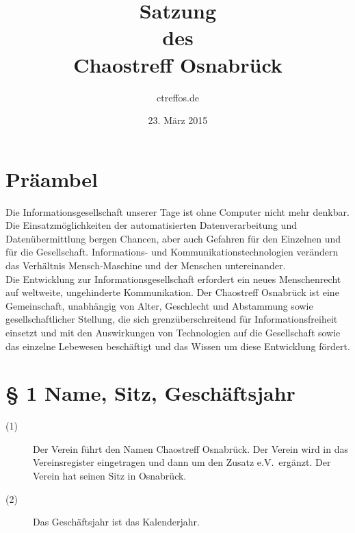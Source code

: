 \documentclass[12pt,paper=a4,ngerman]{scrreprt}
\title{Satzung\\des\\Chaostreff Osnabrück} \author{ctreffos.de}
\date{23. März 2015}
\begin{document}
\maketitle
\tableofcontents
\newpage

\section{Präambel}

Die Informationsgesellschaft unserer Tage ist ohne Computer nicht mehr
denkbar. Die Einsatzmöglichkeiten der automatisierten
Datenverarbeitung und Datenübermittlung bergen Chancen, aber auch
Gefahren für den Einzelnen und für die Gesellschaft. Infor\-mations-
und Kommunikationstechnologien verändern das Verhältnis
Mensch-Maschine und der Menschen untereinander. \\
Die Entwicklung zur Informationsgesellschaft erfordert ein neues
Menschenrecht auf weltweite, ungehinderte Kommunikation. Der
Chaostreff Osnabrück ist eine Gemeinschaft, unabhängig von Alter,
Geschlecht und Abstammung sowie gesellschaftlicher Stellung, die sich
grenzüberschreitend für Informationsfreiheit einsetzt und mit den
Auswirkungen von Technologien auf die Gesellschaft sowie das einzelne
Lebewesen beschäftigt und das Wissen um diese Entwicklung fördert.

\section{\S{} 1 Name, Sitz, Geschäftsjahr}

\begin{description}
\item[(1)]
Der Verein führt den Namen \glqq Chaostreff
Osnabrück\grqq. Der Verein wird in das Vereinsregister eingetragen und
dann um den Zusatz \glqq e.V.\grqq ~ergänzt. Der Verein hat seinen
Sitz in Osnabrück.
\item[(2)]
Das Geschäftsjahr ist das Kalenderjahr.
\end{description}
\end{document}
